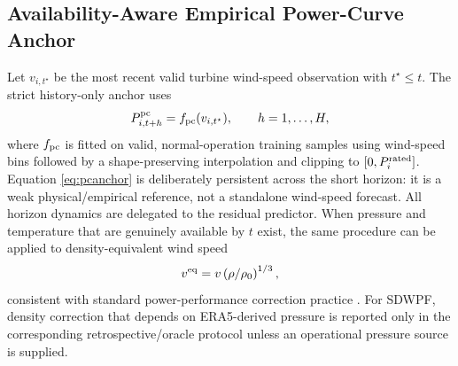 \documentclass[journal]{IEEEtran}
\newcommand{\1}{\mathbb{I}}
\begin{document}
\subsection{Availability-Aware Empirical Power-Curve Anchor}
Let $v_{i,t^\star}$ be the most recent valid turbine wind-speed observation with $t^\star\le t$. The strict history-only anchor uses
\begin{equation}
P^{\rm pc}_{i,t+h}=f_{\rm pc}(v_{i,t^\star}),\qquad h=1,\ldots,H,
\label{eq:pcanchor}
\end{equation}
where $f_{\rm pc}$ is fitted on valid, normal-operation training samples using wind-speed bins followed by a shape-preserving interpolation and clipping to $[0,P_i^{\rm rated}]$. Equation \eqref{eq:pcanchor} is deliberately persistent across the short horizon: it is a weak physical/empirical reference, not a standalone wind-speed forecast. All horizon dynamics are delegated to the residual predictor. When pressure and temperature that are genuinely available by $t$ exist, the same procedure can be applied to density-equivalent wind speed
\begin{equation}
v^{\rm eq}=v\left(\rho/\rho_0\right)^{1/3},
\end{equation}
consistent with standard power-performance correction practice \cite{lee2020pcwg}. For SDWPF, density correction that depends on ERA5-derived pressure is reported only in the corresponding retrospective/oracle protocol unless an operational pressure source is supplied.
\end{document}
